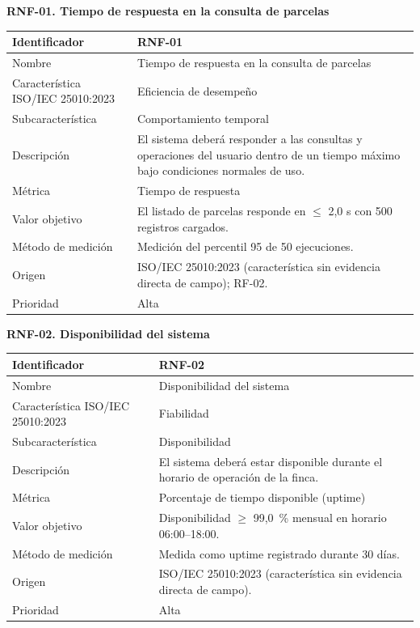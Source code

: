 \documentclass[12pt,a4paper]{article}
\begin{document}
\bigskip
\noindent\textbf{RNF-01. Tiempo de respuesta en la consulta de parcelas}
\label{tab:RNF-01}

\begin{center}
\begin{longtable}{|p{4.2cm}|p{10cm}|}
\hline
Identificador & RNF-01 \\
\hline
Nombre & Tiempo de respuesta en la consulta de parcelas \\
\hline
Característica ISO/IEC 25010:2023 & Eficiencia de desempeño \\
\hline
Subcaracterística & Comportamiento temporal \\
\hline
Descripción & El sistema deberá responder a las consultas y operaciones del usuario dentro de un tiempo máximo bajo condiciones normales de uso. \\
\hline
Métrica & Tiempo de respuesta \\
\hline
Valor objetivo & El listado de parcelas responde en $\leq$ 2,0 s con 500 registros cargados. \\
\hline
Método de medición & Medición del percentil 95 de 50 ejecuciones. \\
\hline
Origen & ISO/IEC 25010:2023 (característica sin evidencia directa de campo); RF-02. \\
\hline
Prioridad & Alta \\
\hline
\end{longtable}
\end{center}

\bigskip
\noindent\textbf{RNF-02. Disponibilidad del sistema}
\label{tab:RNF-02}

\begin{center}
\begin{longtable}{|p{4.2cm}|p{10cm}|}
\hline
Identificador & RNF-02 \\
\hline
Nombre & Disponibilidad del sistema \\
\hline
Característica ISO/IEC 25010:2023 & Fiabilidad \\
\hline
Subcaracterística & Disponibilidad \\
\hline
Descripción & El sistema deberá estar disponible durante el horario de operación de la finca. \\
\hline
Métrica & Porcentaje de tiempo disponible (uptime) \\
\hline
Valor objetivo & Disponibilidad $\geq$ 99,0~\% mensual en horario 06:00--18:00. \\
\hline
Método de medición & Medida como uptime registrado durante 30 días. \\
\hline
Origen & ISO/IEC 25010:2023 (característica sin evidencia directa de campo). \\
\hline
Prioridad & Alta \\
\hline
\end{longtable}
\end{center}
\end{document}
